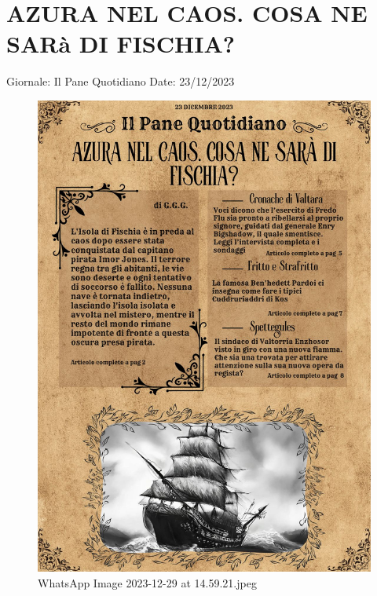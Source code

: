 \section{AZURA NEL CAOS. COSA NE SARà DI
FISCHIA?}\label{azura-nel-caos.-cosa-ne-saruxe0-di-fischia}

Giornale: Il Pane Quotidiano Date: 23/12/2023

\begin{figure}
\centering
\includegraphics{WhatsApp_Image_2023-12-29_at_14.59.21.jpeg}
\caption{WhatsApp Image 2023-12-29 at 14.59.21.jpeg}
\end{figure}

